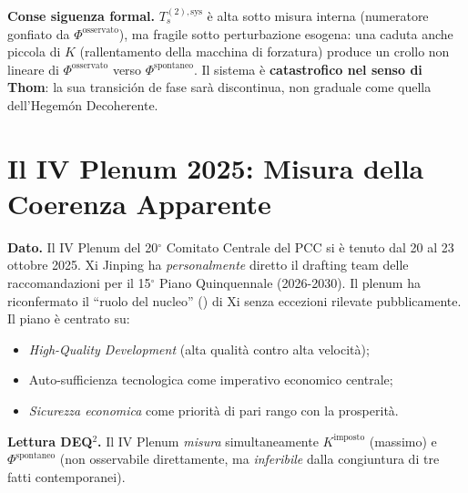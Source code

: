\Proved{} \textbf{Conse siguenza formal.} \(T_s^{(2),\text{sys}}\) è alta
sotto misura interna (numeratore gonfiato da
\(\Phi^{\text{osservato}}\)), ma fragile sotto perturbazione esogena:
una caduta anche piccola di \(K\) (rallentamento della macchina di
forzatura) produce un crollo non lineare di \(\Phi^{\text{osservato}}\)
verso \(\Phi^{\text{spontaneo}}\). Il sistema è \textbf{catastrofico nel
senso di Thom}: la sua transición de fase sarà discontinua, non
graduale come quella dell'Hegemón Decoherente.



\section{Il IV Plenum 2025: Misura della Coerenza
Apparente}\label{il-iv-plenum-2025-misura-della-coerenza-apparente}

\Proved{} \textbf{Dato.} Il IV Plenum del 20$^\circ$ Comitato Centrale del PCC
si è tenuto dal 20 al 23 ottobre 2025. Xi Jinping ha
\emph{personalmente} diretto il drafting team delle raccomandazioni per
il 15$^\circ$ Piano Quinquennale (2026-2030). Il plenum ha riconfermato il
``ruolo del nucleo'' () di Xi senza eccezioni rilevate pubblicamente. Il
piano è centrato su:

\begin{itemize}
\tightlist
\item
  \emph{High-Quality Development} (alta qualità contro alta velocità);
\item
  Auto-sufficienza tecnologica come imperativo economico centrale;
\item
  \emph{Sicurezza economica} come priorità di pari rango con la
  prosperità.
\end{itemize}

\Hypoth{} \textbf{Lettura DEQ$^2$.} Il IV Plenum \emph{misura}
simultaneamente \(K^{\text{imposto}}\) (massimo) e
\(\Phi^{\text{spontaneo}}\) (non osservabile direttamente, ma
\emph{inferibile} dalla congiuntura di tre fatti contemporanei).

